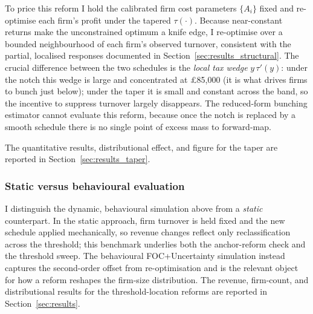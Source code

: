 To price this reform I hold the calibrated firm cost parameters $\{A_i\}$ fixed
and re-optimise each firm's profit under the tapered $\tau(\cdot)$. Because
near-constant returns make the unconstrained optimum a knife edge, I re-optimise
over a bounded neighbourhood of each firm's observed turnover, consistent with the
partial, localised responses documented in Section~\ref{sec:results_structural}. The
crucial difference between the two schedules is the
\emph{local tax wedge} $y\,\tau'(y)$: under the notch this wedge is large and
concentrated at \pounds85{,}000 (it is what drives firms to bunch just below);
under the taper it is small and constant across the band, so the incentive to
suppress turnover largely disappears. The reduced-form bunching estimator cannot
evaluate this reform, because once the notch is replaced by a smooth schedule
there is no single point of excess mass to forward-map.

The quantitative results, distributional effect, and figure for the taper are
reported in Section~\ref{sec:results_taper}.

\subsubsection{Static versus behavioural evaluation}
\label{sec:cf_static_vs_behavioural}

I distinguish the dynamic, behavioural simulation above from a \emph{static}
counterpart. In the static approach, firm turnover is held fixed and the new
schedule applied mechanically, so revenue changes reflect only reclassification
across the threshold; this benchmark underlies both the anchor-reform check and
the threshold sweep. The behavioural FOC+Uncertainty simulation instead captures
the second-order offset from re-optimisation and is the relevant object for how a
reform reshapes the firm-size distribution. The revenue, firm-count, and
distributional results for the threshold-location reforms are reported in
Section~\ref{sec:results}.
